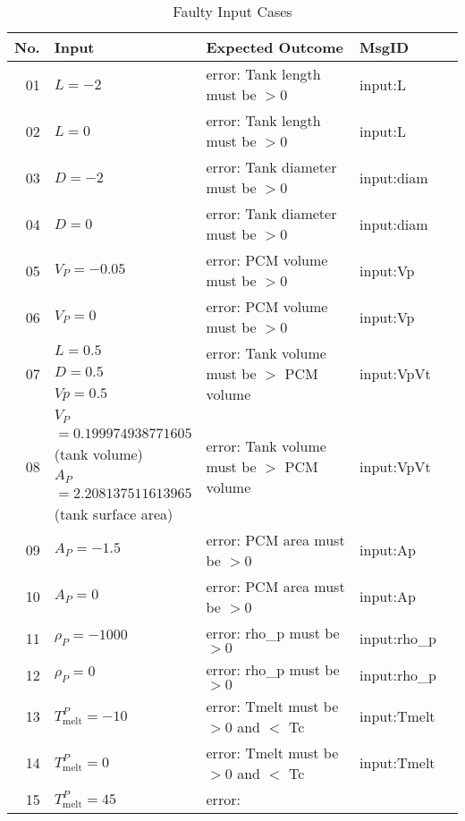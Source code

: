 \documentclass[12pt]{article}
\begin{document}
\begin{center}
	\begin{longtable}{ | r | p{4cm} | p{4cm} | p{4cm} | p{4cm} |}
	\caption{Faulty Input Cases} \\ \hline \label{TblFaultyInput} 
	No. & Input & Expected Outcome & MsgID \\ \hline
	01 & $L = -2$ & error: Tank length must be $> 0$ & input:L \\ \hline
	02 & $L = 0$ & error: Tank length must be $> 0$ & input:L\\ \hline
	03 & $D = -2$ & error: Tank diameter must be $> 0$ & input:diam\\ \hline
	04 & $D = 0$ & error: Tank diameter must be $> 0$ & input:diam \\ \hline
	05 & $V_P = -0.05$ &error: PCM volume must be $> 0$ & input:Vp\\ \hline
	06 & $V_P = 0$ &error: PCM volume must be $> 0$ & input:Vp\\ \hline
	\multirow{3}{*}{07} & $L = 0.5$ & \multirow{3}{*}{\parbox{4cm}{error: Tank volume must 
	be $>$ PCM volume}} & \multirow{3}{*}{input:VpVt} \\
	& $D = 0.5$ & & \\
	& $Vp = 0.5$ & & \\ \hline
	\multirow{6}{*}{08} & $V_P$ & \multirow{6}{*}{\parbox{4cm}{error: Tank volume must be $>$ PCM volume}} & \multirow{6}{*}{input:VpVt} \\ 
	& $=0.199974938771605$ & & \\
	& (tank volume) & & \\
	& $A_P$ & & \\
	& $=2.208137511613965$ & & \\
	& (tank surface area) & & \\ \hline
	09 & $A_P = -1.5$ &error: PCM area must be $> 0$ & input:Ap\\ \hline
	10 & $A_P = 0$ &error: PCM area must be $> 0$ & input:Ap \\ \hline
	11 & $\rho_P = -1000$ &error: rho\_p must be $> 0$ & input:rho\_{p} \\ \hline
	12 & $\rho_P = 0$ &error: rho\_p must be $> 0$ & input:rho\_{p} \\ \hline
	13 & $T^P_{\text{melt}} = -10$ & error: Tmelt must be $> 0$ and $<$ Tc & 
	input:Tmelt \\ \hline
	14 & $T^P_{\text{melt}} = 0$ & error: Tmelt must be $> 0$ and $<$ Tc 
	&input:Tmelt \\ \hline
	\multirow{2}{*}{15} & $T^P_{\text{melt}} = 45$ & \multirow{2}{*}{\parbox{4cm}{error: 
}}
\end{longtable}
\end{center}
\end{document}
